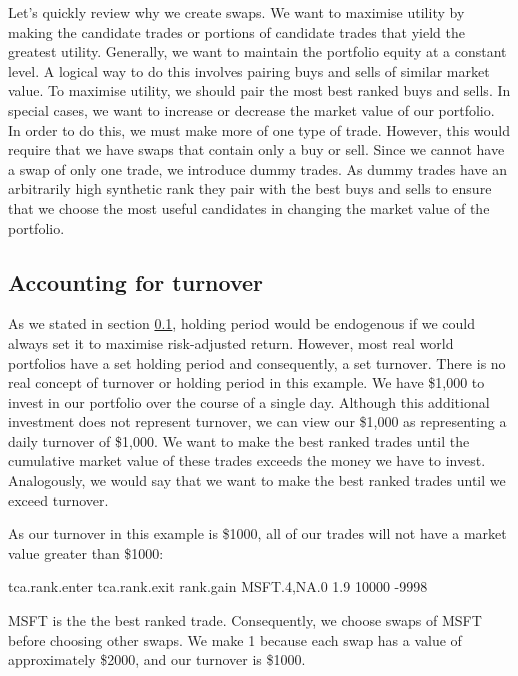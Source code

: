\documentclass{article}
\begin{document}
Let's quickly review why we create swaps.  We want to maximise utility
by making the candidate trades or portions of candidate trades that
yield the greatest  utility.  Generally, we want to maintain
the portfolio equity at a constant level.  A logical way to do this
involves pairing buys and sells of similar market value.  To maximise
utility, we should pair the most best ranked buys and sells.  In
special cases, we want to increase or decrease the market value
of our portfolio.  In order to do this, we must make more of one type
of trade.  However, this would require that we have swaps that contain
only a buy or sell.  Since we cannot have a swap of only one trade, we
introduce dummy trades.  As dummy trades have an arbitrarily high
synthetic rank they pair with the best buys and sells to ensure that
we choose the most useful candidates in changing the market value of
the portfolio.

\subsection{Accounting for turnover}

As we stated in section \ref{}, holding period would be endogenous if
we could always set it to maximise risk-adjusted return.  However,
most real world portfolios have a set holding period and consequently,
a set turnover.  There is no real concept of turnover or holding
period in this example.  We have \$1,000 to invest in our portfolio
over the course of a single day.  Although this additional investment
does not represent turnover, we can view our \$1,000 as representing a
daily turnover of \$1,000.  We want to make the best ranked trades
until the cumulative market value of these trades exceeds the money we
have to invest.  Analogously, we would say that we want to make the
best ranked trades until we exceed turnover.

As our turnover in this example is \$1000, all of our
trades will not have a market value greater than
\$1000:

\begin{Schunk}
\begin{Soutput}
            tca.rank.enter tca.rank.exit rank.gain
MSFT.4,NA.0            1.9         10000     -9998
\end{Soutput}
\end{Schunk}

MSFT is the the best ranked trade.  Consequently, we choose swaps of
MSFT before choosing other swaps.  We make
1 because each swap has a value of
approximately \$2000, and our turnover is
\$1000.
\end{document}
